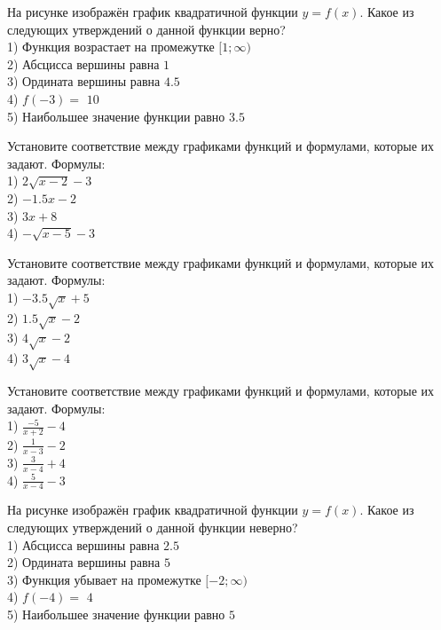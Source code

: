 \documentclass[4apaper]{article}
\begin{document}
\begin{taskBN}{21}
На рисунке изображён график квадратичной функции $y=f(x)$. Какое из следующих утверждений о данной функции верно?\\1) Функция возрастает на промежутке $[1; \infty)$\\2) Абсцисса вершины равна $1$\\3) Ордината вершины равна $4.5$\\4) $f(-3)=$ $10$\\5) Наибольшее значение функции равно  $3.5$
\end{taskBN}

\begin{taskBN}{22}
Установите соответствие между графиками функций и формулами, которые их задают. Формулы: \\1) $2\sqrt{x-2}-3$\\2) $-1.5x-2$\\3) $3x+8$\\4) $-\sqrt{x-5}-3$
\end{taskBN}

\begin{taskBN}{23}
Установите соответствие между графиками функций и формулами, которые их задают. Формулы: \\1) $-3.5\sqrt{x}+5$\\2) $1.5\sqrt{x}-2$\\3) $4\sqrt{x}-2$\\4) $3\sqrt{x}-4$
\end{taskBN}

\begin{taskBN}{24}
Установите соответствие между графиками функций и формулами, которые их задают. Формулы: \\1) $\frac{-5}{x+2}-4$\\2) $\frac{1}{x-3}-2$\\3) $\frac{3}{x-4}+4$\\4) $\frac{5}{x-4}-3$
\end{taskBN}

\begin{taskBN}{25}
На рисунке изображён график квадратичной функции $y=f(x)$. Какое из следующих утверждений о данной функции неверно?\\1) Абсцисса вершины равна $2.5$\\2) Ордината вершины равна $5$\\3) Функция убывает на промежутке $[-2; \infty)$\\4) $f(-4)=$ $4$\\5) Наибольшее значение функции равно  $5$
\end{taskBN}
\end{document}
